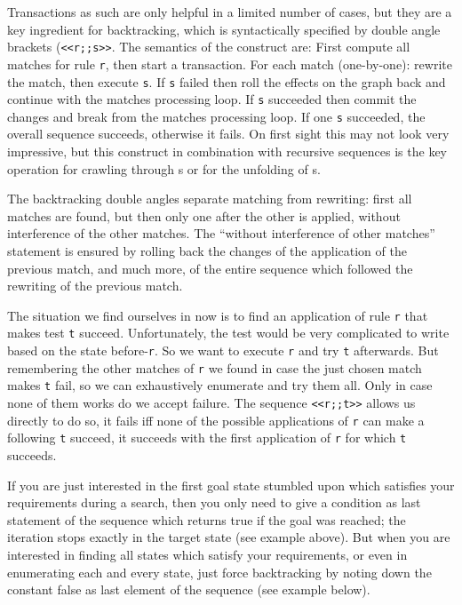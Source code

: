 Transactions as such are only helpful in a limited number of cases, but they are a key ingredient for backtracking, which is syntactically specified by double angle brackets (\texttt{<<r;;s>>}.
The semantics of the construct are:
First compute all matches for rule \texttt{r}, then start a transaction.
For each match (one-by-one): rewrite the match, then execute \texttt{s}.
If \texttt{s} failed then roll the effects on the graph back and continue with the matches processing loop.
If \texttt{s} succeeded then commit the changes and break from the matches processing loop.
If one \texttt{s} succeeded, the overall sequence succeeds, otherwise it fails.
On first sight this may not look very impressive, but this construct in combination with recursive sequences is the key operation for crawling through s or for the unfolding of s.

The backtracking double angles separate matching from rewriting: first all matches are found, but then only one after the other is applied, without interference of the other matches.
The ``without interference of other matches'' statement is ensured by rolling back the changes of the application of the previous match, and much more, of the entire sequence which followed the rewriting of the previous match.

\begin{example}
The situation we find ourselves in now is to find an application of rule \texttt{r} that makes test \texttt{t} succeed. Unfortunately, the test would be very complicated to write based on the state before-\texttt{r}. So we want to execute \texttt{r} and try \texttt{t} afterwards. But remembering the other matches of \texttt{r} we found in case the just chosen match makes \texttt{t} fail, so we can exhaustively enumerate and try them all. Only in case none of them works do we accept failure.
The sequence \verb#<<r;;t>># allows us directly to do so, it fails iff none of the possible applications of \texttt{r} can make a following \texttt{t} succeed, it succeeds with the first application of \texttt{r} for which \texttt{t} succeeds. 
\end{example}

If you are just interested in the first goal state stumbled upon which satisfies your requirements during a search,
then you only need to give a condition as last statement of the sequence which returns true if the goal was reached; the iteration stops exactly in the target state (see example above).
But when you are interested in finding all states which satisfy your requirements, or even in enumerating each and every state, just force backtracking by noting down the constant false as last element of the sequence (see example below).

